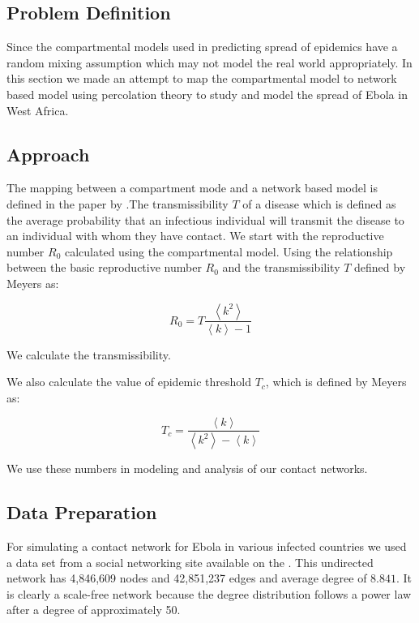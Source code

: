 \documentclass[10pt, journal,onecolumn]{IEEEtran}
\begin{document}
\subsection*{\textbf{Problem Definition}}
Since the compartmental models used in predicting spread of epidemics have a random mixing assumption which may not model the real world appropriately. In this section we made an attempt  to map the compartmental model to network based model  using percolation theory to study  and model the spread of Ebola in West Africa.

\subsection*{\textbf{Approach}}

The mapping between a compartment mode and a network based model is defined in the paper by \cite{meyers2005network}.The transmissibility $T$ of a disease which is defined as the average probability that an infectious
individual will transmit the disease to an individual with whom they have contact. 
We start with the reproductive number $R_0$ calculated using the compartmental model.
Using the relationship between the basic reproductive number
$R_0$ and the transmissibility $T$  defined by Meyers as:

\[
R_0 = T  \dfrac{\left\langle k^2 \right\rangle}{\left\langle k \right\rangle-1}
\]

We calculate the transmissibility.

We also calculate the value of epidemic threshold $T_c$, which is defined by Meyers as:

\[
T_c =\dfrac{\left\langle k \right\rangle}{\left\langle k^2 \right\rangle - \left\langle k \right\rangle}
\]

We use these numbers in modeling and analysis of our contact networks.


\subsection*{\textbf{Data Preparation}}

For simulating a contact network for Ebola in various infected countries we used a data set from a social networking site available on
the \cite{topcoderdata}.
This undirected network has 4,846,609 nodes and 42,851,237 edges and average degree of $8.841$.
It is clearly a scale-free network because the degree distribution follows a power law after a degree of
approximately 50.
\end{document}
